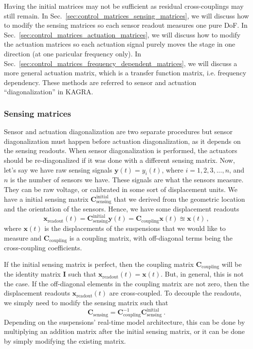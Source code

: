 Having the initial matrices may not be sufficient as residual cross-couplings may still remain.
In Sec.~\ref{sec:control_matrices_sensing_matrices}, we will discuss how to modify the sensing matrices so each sensor readout measures one pure DoF.
In Sec.~\ref{sec:control_matrices_actuation_matrices}, we will discuss how to modify the actuation matrices so each actuation signal purely moves the stage in one direction (at one paricular frequency only).
In Sec.~\ref{sec:control_matrices_frequency_dependent_matrices}, we will discuss a more general actuation matrix, which is a transfer function matrix, i.e. frequency dependency.
These methods are referred to sensor and actuation ``diagonalization'' in KAGRA.


\subsubsection{Sensing matrices \label{sec:control_matrices_sensing_matrices}}
Sensor and actuation diagonalization are two separate procedures but sensor diagonalization must happen before actuation diagonalization, as it depends on the sensing readouts.
When sensor diagonalization is performed, the actuators should be re-diagonalized if it was done with a different sensing matrix.
Now, let's say we have raw sensing signals $\mathbf{y}(t)=y_i(t)$, where $i=1,2,3,...,n$, and $n$ is the number of sensors we have.
These signals are what the sensors measure.
They can be raw voltage, or calibrated in some sort of displacement units.
We have a initial sensing matrix $\mathbf{C}_\mathrm{sensing}^\mathrm{initial}$ that we derived from the geometric location and the orientation of the sensors.
Hence, we have some displacement readouts
\begin{equation}
	\mathbf{x}_\mathrm{readout}(t)=\mathbf{C}_\mathrm{sensing}^\mathrm{initial}\mathbf{y}(t)=\mathbf{C}_\mathrm{coupling}\mathbf{x}(t)\approxeq\mathbf{x}(t)\,,
\end{equation}
where $\mathbf{x}(t)$ is the displacements of the suspensions that we would like to measure and $\mathbf{C}_\mathrm{coupling}$ is a coupling matrix, with off-diagonal terms being the cross-coupling coefficients.

If the initial sensing matrix is perfect, then the coupling matrix $\mathbf{C}_\mathrm{coupling}$ will be the identity matrix $\mathbf{I}$ such that $\mathbf{x}_\mathrm{readout}(t)=\mathbf{x}(t)$.
But, in general, this is not the case.
If the off-diagonal elements in the coupling matrix are not zero, then the displacement readouts $\mathbf{x}_\mathrm{readout}(t)$ are cross-coupled.
To decouple the readouts, we simply need to modify the sensing matrix such that
\begin{equation}
	\boxed{
		\mathbf{C}_\mathrm{sensing} = \mathbf{C}_\mathrm{coupling}^{-1} \mathbf{C}_\mathrm{sensing}^\mathrm{initial}
}\ .
	\label{eqn:sensing_matrix_diagonalization}
\end{equation}
Depending on the suspensions' real-time model architecture, this can be done by multiplying an addition matrix after the initial sensing matrix, or it can be done by simply modifying the existing matrix.

